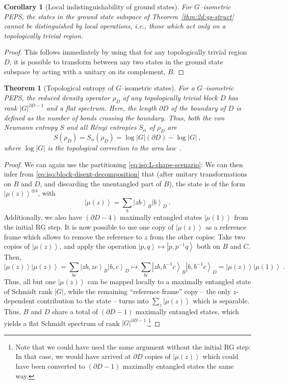 \documentclass{article}
\newcommand{\ket}[1]{\left|#1\right\rangle}
\theoremstyle{plain}
\newtheorem{theorem}[lemma]{Theorem}
\newtheorem{corollary}[lemma]{Corollary}
\theoremstyle{definition}
\numberwithin{equation}{section}  %
\begin{document}
\begin{corollary}[Local indistinguishability of ground states]
    For $G$--isometric PEPS, the states in the ground state subspace of
    Theorem~\ref{thm:2d:gs-struct} cannot be distinguished by local
    operations, i.e., those which act only on a topologically trivial region.
\end{corollary}
\begin{proof}
    This follows immediately by using that for any topologically trivial
    region $D$, it is possible to transform between any two states
    in the ground state subspace  by acting with a unitary on its complement,
    $B$.
\end{proof}


\begin{theorem}[Topological entropy of $G$--isometric states]
    For a $G$--isometric PEPS, the reduced density operator
    $\rho_D$ of any topologically trivial block $D$  has
    rank $|G|^{\partial D-1}$
    and a flat spectrum. Here, the length $\partial D$ of the boundary
    of $D$  is defined as the number of bonds crossing the boundary.
    Thus, both the von Neumann entropy $S$ and all R\'enyi entropies
    $S_\alpha$ of $\rho_D$ are
    \[
        S(\rho_D)=S_\alpha(\rho_D)=\log|G|(\partial D)-\log |G|\ ,
    \]
    where $\log |G|$ is the topological correction to the area
    law~\cite{kitaev:topological-entropy,levin:topological-entropy,flammia:stringnet-renyientropy}.
\end{theorem}
\begin{proof}
    We can again use the partitioning \eqref{eq:iso:L-shape-scenario}:
    We can then infer from \eqref{eq:iso:block-disent-decomposition} that
    (after unitary transformations on $B$ and $D$, and discarding the
    unentangled part of $B$), the state is of the form $\ket{\mu(z)}^{\otimes
            4}$, with
    \[
        \ket{\mu(z)}=\sum_b\ket{zb}_B\ket{b}_D\ .
    \]
    Additionally, we also have $(\partial D-4)$ maximally entangled states
    $\ket{\mu(1)}$ from the initial RG step.
    It is now possible to use one copy of $\ket{\mu(z)}$ as a reference frame
    which allows to remove the reference to $z$ from the other copies: Take
    two copies of $\ket{\mu(z)}$, and apply the operation
    $\ket{p,q}\mapsto \ket{p,p^{-1}q}$ both on $B$ and $C$. Then,
    \[
        \ket{\mu(z)}\ket{\mu(z)}=\sum_{bc}\ket{zb,zc}_B\ket{b,c}_D
        \mapsto
        \sum_{bc}\ket{zb,b^{-1}c}_B\ket{b,b^{-1}c}_D =
        \ket{\mu(z)}\ket{\mu(1)}\ .
    \]
    Thus, all but one $\ket{\mu(z)}$ can be mapped locally to a maximally
    entangled state of Schmidt rank $|G|$, while the remaining ``reference
    frame'' copy -- the only $z$-dependent contribution to the state --
    turns into $\sum_z\ket{\mu(z)}$ which is separable. Thus, $B$ and $D$
    share a total of $(\partial D-1)$ maximally entangled states, which yields
    a flat Schmidt spectrum of rank $|G|^{\partial D-1}$.\footnote{
        Note that we could have used the same argument without the initial RG
        step: In that case, we would have arrived at $\partial D$ copies
        of $\ket{\mu(z)}$ which could have been converted to $(\partial D-1)$
        maximally entangled states the same way.}
\end{proof}
\end{document}
